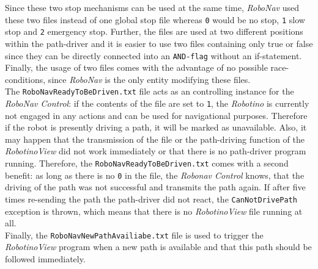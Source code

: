 Since these two stop mechanisms can be used at the same time, \textit{RoboNav} used these two files instead of one global stop file whereas \texttt{0} would be no stop, \texttt{1} slow stop and \texttt{2} emergency stop. Further, the files are used at two different positions within the path-driver and it is easier to use two files containing only true or false since they can be directly connected into an \texttt{AND-flag} without an if-statement. Finally, the usage of two files comes with the advantage of no possible race-conditions, since \textit{RoboNav} is the only entity modifying these files. 
\\
The \texttt{RoboNavReadyToBeDriven.txt} file acts as an controlling instance for the \textit{RoboNav Control}: if the contents of the file are set to \texttt{1}, the \textit{Robotino} is currently not engaged in any actions and can be used for navigational purposes. Therefore if the robot is presently driving a path, it will be marked as unavailable. Also, it may happen that the transmission of the file or the path-driving function of the \textit{RobotinoView} did not work immediately or that there is no path-driver program running. Therefore, the \texttt{RoboNavReadyToBeDriven.txt} comes with a second benefit: as long as there is no \texttt{0} in the file, the \textit{Robonav Control} knows, that the driving of the path was not successful and transmits the path again. If after five times re-sending the path the path-driver did not react, the \texttt{CanNotDrivePath} 
exception is thrown, which means that there is no \textit{RobotinoView} file running at all. \\ 
Finally, the \texttt{RoboNavNewPathAvailiabe.txt} file is used to trigger the \textit{RobotinoView} program when a new path is available and that this path should be followed immediately.

